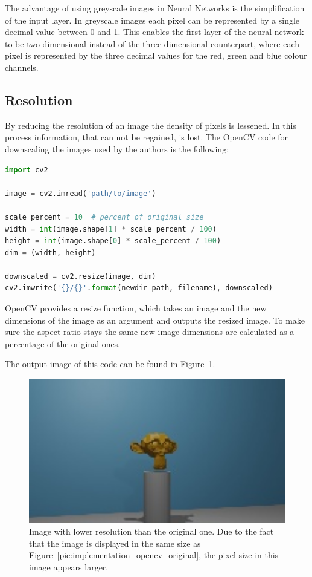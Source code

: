 The advantage of using greyscale images in Neural Networks is the simplification of the input layer. In greyscale images each pixel can be represented by a single decimal value between 0 and 1. This enables the first layer of the neural network to be two dimensional instead of the three dimensional counterpart, where each pixel is represented by the three decimal values for the red, green and blue colour channels.

\subsection{Resolution}
By reducing the resolution of an image the density of pixels is lessened. In this process information, that can not be regained, is lost. The OpenCV code for downscaling the images used by the authors is the following:

\begin{lstlisting}[language=python]
import cv2

image = cv2.imread('path/to/image')

scale_percent = 10  # percent of original size
width = int(image.shape[1] * scale_percent / 100)
height = int(image.shape[0] * scale_percent / 100)
dim = (width, height)

downscaled = cv2.resize(image, dim)
cv2.imwrite('{}/{}'.format(newdir_path, filename), downscaled)
\end{lstlisting}

OpenCV provides a resize function, which takes an image and the new dimensions of the image as an argument and outputs the resized image. To make sure the aspect ratio stays the same new image dimensions are calculated as a percentage of the original ones.

The output image of this code can be found in Figure~\ref{pic:implementation_opencv_resolution}.

\begin{figure}[h!]
	\centering
	\includegraphics[width=4.5in]{img/implementation_opencv_resolution.jpg}
	\caption{Image with lower resolution than the original one. Due to the fact that the image is displayed in the same size as Figure~\ref{pic:implementation_opencv_original}, the pixel size in this image appears larger.}
	\label{pic:implementation_opencv_resolution}
\end{figure}

